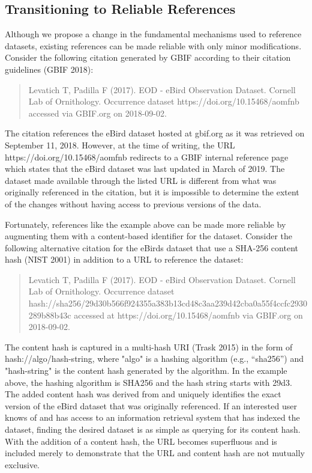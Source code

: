 \documentclass[10pt,letterpaper]{article}
\begin{document}
\subsection*{Transitioning to Reliable References}

Although we propose a change in the fundamental mechanisms used to reference datasets, existing references can be made reliable with only minor modifications. Consider the following citation generated by GBIF according to their citation guidelines (GBIF 2018):

\begin{quote}
    Levatich T, Padilla F (2017). EOD - eBird Observation Dataset. Cornell Lab of Ornithology. Occurrence dataset https://doi.org/10.15468/aomfnb accessed via GBIF.org on 2018-09-02.
\end{quote}

The citation references the eBird dataset hosted at gbif.org as it was retrieved on September 11, 2018. However, at the time of writing, the URL https://doi.org/10.15468/aomfnb redirects to a GBIF internal reference page which states that the eBird dataset was last updated in March of 2019. The dataset made available through the listed URL is different from what was originally referenced in the citation, but it is impossible to determine the extent of the changes without having access to previous versions of the data.

Fortunately, references like the example above can be made more reliable by augmenting them with a content-based identifier for the dataset. Consider the following alternative citation for the eBirds dataset that use a SHA-256 content hash (NIST 2001) in addition to a URL to reference the dataset:

\begin{quote}
    Levatich T, Padilla F (2017). EOD - eBird Observation Dataset. Cornell Lab of Ornithology. Occurrence dataset hash://sha256/29d30b566f924355a383b13cd48c3aa239d42cba0a55f4ccfc2930289b88b43c accessed at https://doi.org/10.15468/aomfnb via GBIF.org on 2018-09-02.
\end{quote}

The content hash is captured in a multi-hash URI (Trask 2015) in the form of hash://algo/hash-string, where "algo" is a hashing algorithm (e.g., “sha256”) and "hash-string" is the content hash generated by the algorithm. In the example above, the hashing algorithm is SHA256 and the hash string starts with 29d3. The added content hash was derived from and uniquely identifies the exact version of the eBird dataset that was originally referenced. If an interested user knows of and has access to an information retrieval system that has indexed the dataset, finding the desired dataset is as simple as querying for its content hash. With the addition of a content hash, the URL becomes superfluous and is included merely to demonstrate that the URL and content hash are not mutually exclusive.
\end{document}
